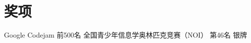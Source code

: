 \documentclass[10pt,a4paper,roman]{moderncv} %
\begin{document}

\section{奖项}
        {Google Codejam}
        {前500名}
        {}{}{}
        {全国青少年信息学奥林匹克竞赛（NOI）}
        {第46名}
        {银牌}
        {}{}
\end{document}
